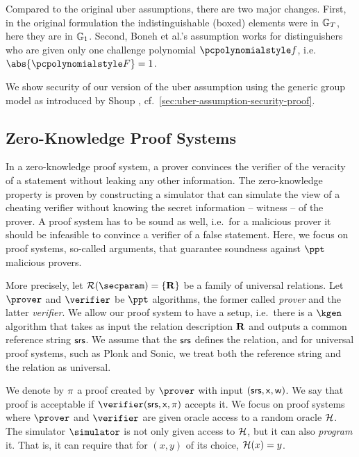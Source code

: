 Compared to the original uber assumptions, there are two major changes. First, in the
original formulation the indistinguishable (boxed) elements were in $\mathbb{G}_T$, here
they are in $\mathbb{G}_1$.
Second, Boneh et al.'s assumption works for distinguishers who are given only one
challenge polynomial $\p{f}$, i.e.~$\abs{\p{F}} = 1$.
  
We show security of our version of the uber assumption using the generic group model
as introduced by Shoup \cite{EC:Shoup97},
cf.~\cref{sec:uber-assumption-security-proof}.

\subsection{Zero-Knowledge Proof Systems}\label{prelim:nizk}
In a zero-knowledge proof system, a prover convinces the verifier of the veracity of a statement
without leaking any other information. The zero-knowledge property is proven by constructing a
simulator that can simulate the view of a cheating verifier without knowing the secret
information -- witness -- of the prover. A proof system has to be sound as well, i.e.~for a
malicious prover it should be infeasible to convince a verifier of a false statement. Here, we
focus on proof systems, so-called arguments, that guarantee soundness against $\ppt$ malicious provers.

More precisely, let $\RELGEN(\secparam) = \smallset{\REL}$ be a family of universal 
relations. Let $\prover$ and $\verifier$ be $\ppt$ algorithms, the former called \emph{prover}
and the latter \emph{verifier}. We allow our proof system to have a setup, i.e.~there is a
$\kgen$ algorithm that takes as input the relation description $\mathbf{R}$ and outputs a common
reference string $\mathsf{srs}$. We assume that the $\mathsf{srs}$ defines the relation, and for universal proof
systems, such as Plonk and Sonic, we treat both the reference string and the relation as
universal.

We denote by $\pi$ a proof created by $\prover$ with input
$(\mathsf{srs}, \mathsf{x}, \mathsf{w})$. We say that proof is acceptable if $\verifier (\srs, \inp,
\zkproof)$ accepts it. We focus on proof systems where $\prover$ and
$\verifier$ are given oracle access to a random oracle $\mathcal{H}$. The simulator
$\simulator$ is not only given access to $\mathcal{H}$, but it can also \emph{program}
it. That is, it can require that for $(x, y)$ of its choice, $\mathcal{H} (x) = y$.

